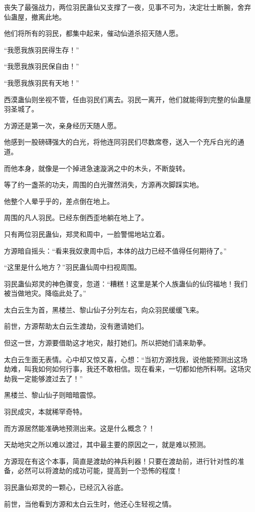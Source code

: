 \begin{this_body}
丧失了最强战力，两位羽民蛊仙又支撑了一夜，见事不可为，决定壮士断腕，舍弃仙蛊屋，撤离此地。

他们将所有的羽民，都集中起来，催动仙道杀招天随人愿。

“我愿我族羽民得生存！”

“我愿我族羽民保自由！”

“我愿我族羽民有天地！”

西漠蛊仙则坐视不管，任由羽民们离去。羽民一离开，他们就能得到完整的仙蛊屋羽圣城了。

方源还是第一次，亲身经历天随人愿。

他感到一股磅礴强大的白光，将他连同羽民们尽数席卷，送入一个充斥白光的通道。

而他本身，就像是一个掉进急速漩涡之中的木头，不断旋转。

等了约一盏茶的功夫，周围的白光骤然消失，方源再次脚踩实地。

他整个人晕乎乎的，差点倒在地上。

周围的凡人羽民。已经东倒西歪地躺在地上了。

只有两位羽民蛊仙，郑灵和周中，一脸警惕地站立着。

方源暗自摇头：“看来我奴隶周中后，本体的战力已经不值得任何期待了。”

“这里是什么地方？”羽民蛊仙周中扫视周围。

羽民蛊仙郑灵的神色骤变，忽道：“糟糕！这里是某个人族蛊仙的仙窍福地！我们被当做地灾。降临此处了。”

太白云生为首，黑楼兰、黎山仙子分列左右，向众羽民缓缓飞来。

前世，方源帮助太白云生渡劫，没有邀请她们。

但这一世，方源要借助这才地灾，敲打她们。所以把她们请来助拳。

太白云生面无表情。心中却又惊又喜，心想：“当初方源找我，说他能预测出这场劫难，叫我如何如何行事，我还不敢相信。现在看来，一切都如他所料啊。这场灾劫我一定能够渡过去了！”

黑楼兰、黎山仙子则暗暗震惊。

羽民成灾，本就稀罕奇特。

而方源居然能准确地预测出来。这是什么概念？！

天劫地灾之所以难以渡过，其中最主要的原因之一，就是难以预测。

方源现在有这个本事，简直是渡劫的神兵利器！只要在渡劫前，进行针对性的准备，必然可以将渡劫的成功可能，提高到一个恐怖的程度！

羽民蛊仙郑灵的一颗心，已经沉入谷底。

前世，当他看到方源和太白云生时，他还心生轻视之情。


\end{this_body}
